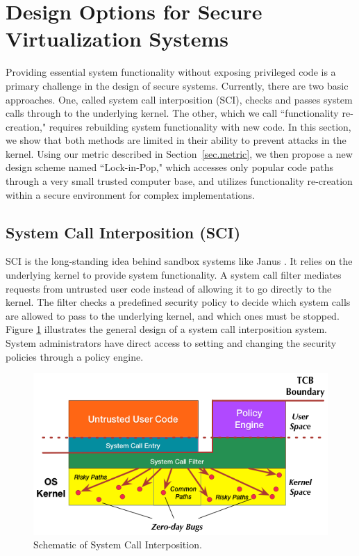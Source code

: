 \section{Design Options for Secure Virtualization Systems}
\label{sec.design}

Providing essential system functionality without exposing privileged code is a
primary challenge in the design of secure systems.
Currently, there are two basic approaches.
One, called system call interposition (SCI), checks and passes system calls
through to the underlying kernel. The other, which we call ``functionality
re-creation," requires rebuilding system functionality with new code. In this
section, we show that both methods are limited in their ability to
prevent attacks in the kernel.
Using our metric described in Section~\ref{sec.metric},
we then propose a new design scheme named ``Lock-in-Pop," which accesses only popular
 code paths through a very small trusted computer base, and utilizes
 functionality re-creation within a secure environment for complex implementations.

\subsection{System Call Interposition (SCI)}
SCI is the long-standing idea behind sandbox systems like Janus
\cite{Janus0:96, Janus:99}. It relies on the underlying kernel
to provide system functionality. A system call filter mediates requests
from untrusted user code instead of allowing it to go directly to the kernel.
The filter checks a predefined security policy to decide which system calls are
allowed to pass to the underlying kernel, and which ones must be stopped.
Figure \ref{fig:design_system_call_interposition} illustrates the general design
of a system call interposition system. System administrators have direct access to
setting and changing the security policies through a policy engine.

\begin{figure}%
\centering
\includegraphics[width=1.0\columnwidth]{diagram/Virtualization_Design_Model_03.png}
\caption{\small Schematic of System Call Interposition.}
\label{fig:design_system_call_interposition}
\end{figure}


